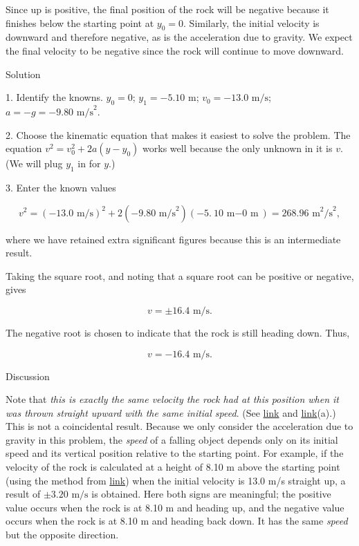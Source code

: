 \documentclass[
]{book}
\begin{document}
Since up is positive, the final position of the rock will be negative
because it finishes below the starting point at \({y_{0} = 0}{}\).
Similarly, the initial velocity is downward and therefore negative, as
is the acceleration due to gravity. We expect the final velocity to be
negative since the rock will continue to move downward.

{Solution}

1. Identify the knowns. \(y_{0} = 0\);
\({y_{1}{= - 5}}\text{.}\text{10\ m}\);
\(v_{0} = {- \text{13}}\text{.0\ m/s}\);
\({{{a = {- g}} = {- 9}}\text{.}\text{80\ m}\text{/s}^{2}}{}\).

2. Choose the kinematic equation that makes it easiest to solve the
problem. The equation \({{v^{2} = {v_{0}^{2} + 2a}}({y - y_{0}})}{}\)
works well because the only unknown in it is \(v{}\). (We will plug
\(y_{1}{}\) in for \(y{}\).)

3. Enter the known values

\leavevmode{}%
\[{{{v^{2} = {\left( {{- \text{13}}\text{.}\text{0\ m/s}} \right)^{2} + 2}}\left( {{- 9}\text{.}\text{80\ m/s}^{2}} \right){\left( {{- 5}\text{.}{\text{10\ m} - \text{0\ m}}} \right) = \text{268}}\text{.}\text{96\ m}^{2}\text{/s}^{2}},}{}\]

where we have retained extra significant figures because this is an
intermediate result.

Taking the square root, and noting that a square root can be positive or
negative, gives

\leavevmode{}%
\[{{{v = {\pm \text{16}}}\text{.4\ m/s}}.}{}\]

The negative root is chosen to indicate that the rock is still heading
down. Thus,

\leavevmode{}%
\[{{{v = {- \text{16}}}\text{.4\ m/s}}.}{}\]

{Discussion}

Note that \emph{this is exactly the same velocity the rock had at this
position when it was thrown straight upward with the same initial
speed}. (See \protect\hyperlink{fs-id4067058}{link} and
\protect\hyperlink{import-auto-id4173440}{link}(a).) This is not
a coincidental result. Because we only consider the acceleration due to
gravity in this problem, the \emph{speed} of a falling object depends only on
its initial speed and its vertical position relative to the starting
point. For example, if the velocity of the rock is calculated at a
height of 8.10 m above the starting point (using the method from
\protect\hyperlink{fs-id4067058}{link}) when the initial velocity
is 13.0 m/s straight up, a result of \({{\pm 3}\text{.}\text{20\ m/s}}{}\)
is obtained. Here both signs are meaningful; the positive value occurs
when the rock is at 8.10 m and heading up, and the negative value occurs
when the rock is at 8.10 m and heading back down. It has the same
\emph{speed} but the opposite direction.
\end{document}
